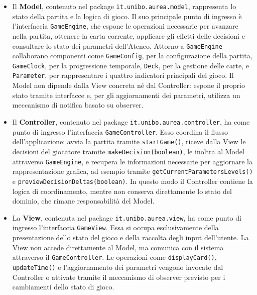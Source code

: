 \documentclass[11pt, a4paper, oneside]{report}
\begin{document}
\begin{itemize}
    \item Il \textbf{Model}, contenuto nel package \texttt{it.unibo.aurea.model}, 
        rappresenta lo stato della partita e la logica di gioco. Il suo principale 
        punto di ingresso è l'interfaccia \texttt{GameEngine}, che espone le operazioni 
        necessarie per avanzare nella partita, ottenere la carta corrente, applicare gli 
        effetti delle decisioni e consultare lo stato dei parametri dell'Ateneo. Attorno 
        a \texttt{GameEngine} collaborano componenti come \texttt{GameConfig}, per la 
        configurazione della partita, \texttt{GameClock}, per la progressione temporale, 
        \texttt{Deck}, per la gestione delle carte, e \texttt{Parameter}, per rappresentare 
        i quattro indicatori principali del gioco. Il Model non dipende dalla View concreta 
        né dal Controller: espone il proprio stato tramite interfacce e, per gli aggiornamenti 
        dei parametri, utilizza un meccanismo di notifica basato su observer.

    \item Il \textbf{Controller}, contenuto nel package \texttt{it.unibo.aurea.controller}, 
        ha come punto di ingresso l'interfaccia \texttt{GameController}. Esso coordina il flusso 
        dell'applicazione: avvia la partita tramite \texttt{startGame()}, riceve dalla View le 
        decisioni del giocatore tramite \texttt{makeDecision(boolean)}, le inoltra al Model 
        attraverso \texttt{GameEngine}, e recupera le informazioni necessarie per aggiornare 
        la rappresentazione grafica, ad esempio tramite \texttt{getCurrentParametersLevels()} 
        e \texttt{previewDecisionDeltas(boolean)}. In questo modo il Controller contiene la 
        logica di coordinamento, mentre non conserva direttamente lo stato del dominio, che 
        rimane responsabilità del Model.

    \item La \textbf{View}, contenuta nel package \texttt{it.unibo.aurea.view}, ha come punto di 
        ingresso l'interfaccia \texttt{GameView}. Essa si occupa esclusivamente della presentazione 
        dello stato del gioco e della raccolta degli input dell'utente. La View non accede direttamente 
        al Model, ma comunica con il sistema attraverso il \texttt{GameController}. Le operazioni come 
        \texttt{displayCard()}, \texttt{updateTime()} e l'aggiornamento dei parametri vengono invocate 
        dal Controller o attivate tramite il meccanismo di observer previsto per i cambiamenti dello 
        stato di gioco.
\end{itemize}
\end{document}
